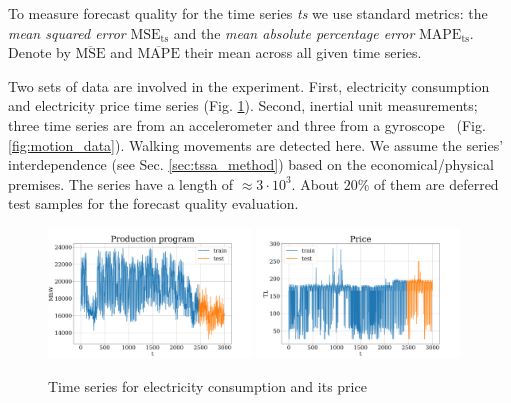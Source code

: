 \documentclass[referee, pdflatex, sn-mathphys-num]{sn-jnl}
\theoremstyle{definition}
\theoremstyle{plain}
\begin{document}
	To measure forecast quality for the time series \textit{ts} we use standard metrics: the \emph{mean squared error} $ \text{MSE}_{\text{ts}} $ and the \emph{mean absolute percentage error} $ \text{MAPE}_{\text{ts}} $. Denote by $ \overline{\text{MSE}} $ and $ \overline{\text{MAPE}} $ their mean across all given time series.
	
	Two sets of data are involved in the experiment. First, electricity consumption and electricity price time series (Fig. \ref{fig:electr_data}). Second, inertial unit measurements; three time series are from an accelerometer and three from a gyroscope~\cite{accelerometryData} (Fig. \ref{fig:motion_data}). Walking movements are detected here. We assume the series' interdependence (see Sec. \ref{sec:tssa_method}) based on the economical/physical premises. The series have a length of $ \approx 3 \cdot 10^3 $. About $ 20\% $ of them are deferred test samples for the forecast quality evaluation.
	
	\begin{figure}[h]
		\centering
		\includegraphics[width=0.48\textwidth, keepaspectratio]{Electricity_Production}
		\includegraphics[width=0.48\textwidth, keepaspectratio]{Electricity_Price}
		\caption{Time series for electricity consumption and its price}\label{fig:electr_data}
	\end{figure}
	
\end{document}
